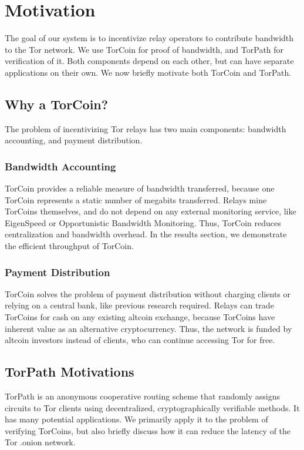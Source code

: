 \section{Motivation} \label{motivation}

The goal of our system is to incentivize relay operators to contribute bandwidth to the Tor network. We use TorCoin for proof of bandwidth, and TorPath for verification of it. Both components depend on each other, but can have separate applications on their own. We now briefly motivate both TorCoin and TorPath.

\subsection{Why a TorCoin?}

The problem of incentivizing Tor relays has two main components: bandwidth accounting, and payment distribution.

\subsubsection{Bandwidth Accounting}

TorCoin provides a reliable measure of bandwidth transferred, because one TorCoin represents a static number of megabits transferred. Relays mine TorCoins themselves, and do not depend on any external monitoring service, like EigenSpeed \cite{jansen2013lira} or Opportunistic Bandwidth Monitoring. \cite{snader2008tune} Thus, TorCoin reduces centralization and bandwidth overhead. In the results section, we demonstrate the efficient throughput of TorCoin.

\subsubsection{Payment Distribution}
TorCoin solves the problem of payment distribution without charging clients or relying on a central bank, like previous research required. \cite{jansen2013lira} Relays can trade TorCoins for cash on any existing altcoin exchange, because TorCoins have inherent value as an alternative cryptocurrency. Thus, the network is funded by altcoin investors instead of clients, who can continue accessing Tor for free.

\subsection{TorPath Motivations}
TorPath is an anonymous cooperative routing scheme that randomly assigns circuits to Tor clients using decentralized, cryptographically verifiable methods. It has many potential applications. We primarily apply it to the problem of verifying TorCoins, but also briefly discuss how it can reduce the latency of the Tor .onion network.


